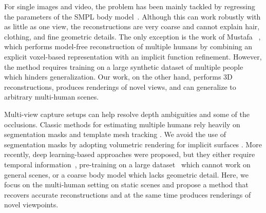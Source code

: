 For single images and video, the problem has been mainly tackled by regressing the parameters of the SMPL \cite{loper2015smpl} body model~\cite{zhang2020perceiving, choi2022learning, sun2022putting, sun2021monocular, zanfir2018deep, dong2021shape, zanfir2018monocular, fieraru2020three, jiang2020coherent, zhang2021body, ugrinovic2021body, guler2019holopose}. Although this can work robustly with as little as one view, the reconstructions are very coarse and cannot explain hair, clothing, and fine geometric details. 
The only exception is the work of Mustafa \etal~\cite{mustafa2021multi}, which performs model-free reconstruction of multiple humans by combining an explicit voxel-based representation with an implicit function refinement. 
However, %
the method requires training on a large synthetic dataset of multiple people which hinders generalization. Our work, on the other hand, performs 3D reconstructions, produces renderings of novel views, and can generalize to arbitrary multi-human scenes.

Multi-view capture setups can help resolve depth ambiguities and some of the occlusions. 
Classic methods for estimating multiple humans rely heavily on segmentation masks and template mesh tracking \cite{liu2011markerless, liu2013markerless, wu2013set}. We avoid the use of segmentation masks by adopting volumetric rendering for implicit surfaces \cite{wang2021neus}. 
More recently, deep learning-based approaches were proposed, but they either require temporal information~\cite{zheng2021deepmulticap,huang2021dynamic,zhang2021lightweight,shuai2022novel}, pre-training on a large dataset~\cite{zheng2021deepmulticap} which cannot work on general scenes, or a coarse body model \cite{zhang2021lightweight, huang2021dynamic, shuai2022novel} which lacks geometric detail. 
Here, we focus on the multi-human setting on static scenes and propose a method that recovers accurate reconstructions and at the same time produces renderings of novel viewpoints. 
%
%
%
%
%
%
%
